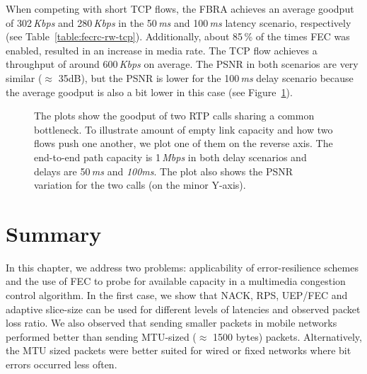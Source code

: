When competing with short TCP flows, the FBRA achieves an average goodput of
302\,\emph{Kbps} and 280\,\emph{Kbps} in the 50\,\emph{ms} and 100\,\emph{ms}
latency scenario, respectively (see Table~\ref{table:fecrc-rw-tcp}).
Additionally, about 85\,\% of the times FEC was enabled, resulted in an
increase in media rate. The TCP flow achieves a throughput of around
600\,\emph{Kbps} on average. The PSNR in both scenarios are very similar
($\approx$ 35dB), but the PSNR is lower for the 100\,\emph{ms} delay scenario because the
average goodput is also a bit lower in this case (see Figure~\ref{fig:fecrc-dnet}).


\begin{figure}
\caption{The plots show the goodput of two RTP calls sharing a common
bottleneck. To illustrate amount of empty link capacity and how two flows push
one another, we plot one of them on the reverse axis. The end-to-end path
capacity is 1\,\emph{Mbps} in both delay scenarios and delays are 50\,\emph{ms}
and \emph{100ms}. The plot also shows the PSNR variation for the two calls (on
the minor Y-axis).}
\label{fig:fecrc-dnet}
\end{figure}


\section{Summary}

In this chapter, we address two problems: applicability of error-resilience
schemes and the use of FEC to probe for available capacity in a multimedia congestion
control algorithm. In the first case, we show that NACK, RPS, UEP/FEC and adaptive 
slice-size can be used for different levels of latencies and observed packet
loss ratio. We also observed that sending smaller packets in mobile networks
performed better than sending MTU-sized ($\approx$ 1500 bytes) packets.
Alternatively, the MTU sized packets were better suited for wired or fixed
networks where bit errors occurred less often.

